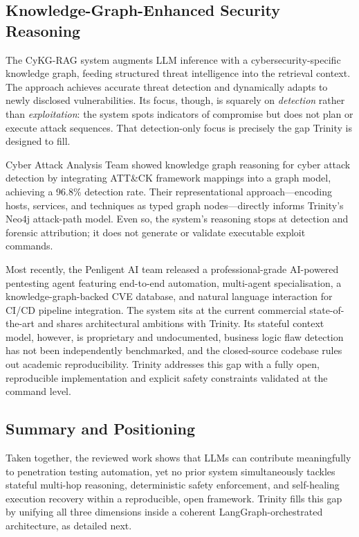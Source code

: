\documentclass[conference]{IEEEtran}
\begin{document}
\subsection{Knowledge-Graph-Enhanced Security Reasoning}

The CyKG-RAG system \cite{cykgrag2025} augments LLM inference with a cybersecurity-specific knowledge graph, feeding structured threat intelligence into the retrieval context. The approach achieves accurate threat detection and dynamically adapts to newly disclosed vulnerabilities. Its focus, though, is squarely on \textit{detection} rather than \textit{exploitation}: the system spots indicators of compromise but does not plan or execute attack sequences. That detection-only focus is precisely the gap Trinity is designed to fill.

Cyber Attack Analysis Team \cite{kgcyber2024} showed knowledge graph reasoning for cyber attack detection by integrating ATT\&CK framework mappings into a graph model, achieving a 96.8\% detection rate. Their representational approach---encoding hosts, services, and techniques as typed graph nodes---directly informs Trinity's Neo4j attack-path model. Even so, the system's reasoning stops at detection and forensic attribution; it does not generate or validate executable exploit commands.

Most recently, the Penligent AI team \cite{penligent2025} released a professional-grade AI-powered pentesting agent featuring end-to-end automation, multi-agent specialisation, a knowledge-graph-backed CVE database, and natural language interaction for CI/CD pipeline integration. The system sits at the current commercial state-of-the-art and shares architectural ambitions with Trinity. Its stateful context model, however, is proprietary and undocumented, business logic flaw detection has not been independently benchmarked, and the closed-source codebase rules out academic reproducibility. Trinity addresses this gap with a fully open, reproducible implementation and explicit safety constraints validated at the command level.

\subsection{Summary and Positioning}

Taken together, the reviewed work shows that LLMs can contribute meaningfully to penetration testing automation, yet no prior system simultaneously tackles stateful multi-hop reasoning, deterministic safety enforcement, and self-healing execution recovery within a reproducible, open framework. Trinity fills this gap by unifying all three dimensions inside a coherent LangGraph-orchestrated architecture, as detailed next.
\end{document}
